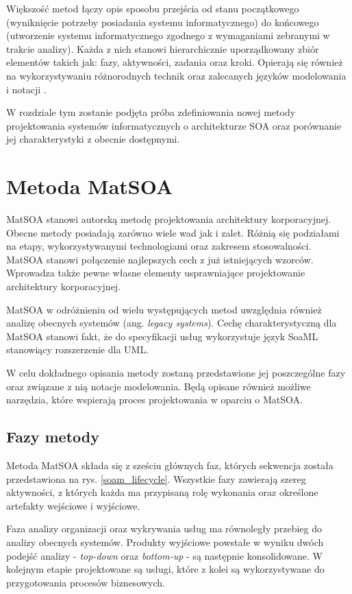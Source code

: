 Większość metod łączy opis sposobu przejścia od stanu początkowego (wyniknięcie potrzeby posiadania systemu informatycznego) do końcowego (utworzenie systemu informatycznego zgodnego z wymaganiami zebranymi w trakcie analizy).  Każda z nich stanowi hierarchicznie uporządkowany zbiór elementów takich jak: fazy, aktywności, zadania oraz kroki. Opierają się również na wykorzystywaniu różnorodnych technik oraz zalecanych języków modelowania i notacji \cite{OffCompSOAM}.

W rozdziale tym zostanie podjęta próba zdefiniowania nowej metody projektowania systemów informatycznych o architekturze SOA oraz porównanie jej charakterystyki z obecnie dostępnymi.


\section{Metoda MatSOA}
MatSOA stanowi autorską metodę projektowania architektury korporacyjnej. Obecne metody posiadają zarówno wiele wad jak i zalet. Różnią się podziałami na etapy, wykorzystywanymi technologiami oraz zakresem stosowalności. MatSOA stanowi połączenie najlepszych cech z już istniejących wzorców. Wprowadza także pewne własne elementy usprawniające projektowanie architektury korporacyjnej. 

MatSOA w odróżnieniu od wielu występujących metod uwzględnia również analizę obecnych systemów (ang. \emph{legacy systems}). Cechę charakterystyczną dla MatSOA stanowi fakt, że do specyfikacji usług wykorzystuje język SoaML stanowiący rozszerzenie dla UML. 

W celu dokładnego opisania metody zostaną przedstawione jej poszczególne fazy oraz związane z nią notacje modelowania. Będą opisane również możliwe narzędzia, które wspierają proces projektowania w oparciu o MatSOA.

\subsection{Fazy metody}
Metoda MatSOA składa się z sześciu głównych faz, których sekwencja została przedstawiona na rys. \ref{soam_lifecycle}. Wszystkie fazy zawierają szereg aktywności, z których każda ma przypisaną rolę wykonania oraz określone artefakty wejściowe i wyjściowe.

Faza analizy organizacji oraz wykrywania usług ma równoległy przebieg do analizy obecnych systemów. Produkty wyjściowe powstałe w wyniku dwóch podejść analizy - \emph{top-down} oraz \emph{bottom-up} - są następnie konsolidowane. W kolejnym etapie projektowane są usługi, które z kolei są wykorzystywane do przygotowania procesów biznesowych.

